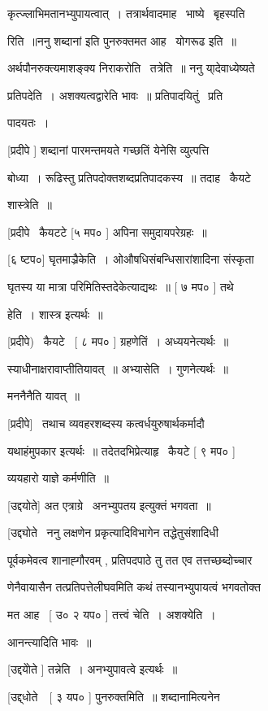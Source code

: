 \documentclass[11pt, openany]{book}
\begin{document}
कृत्ज्लाभिमतानभ्युपायत्वात्~। तत्रार्थवादमाह \textendash\ भाष्ये \textendash\ बृहस्पति \textendash\ 

रिति~॥ननु {\qt शब्दानां इति पुनरुक्तमत आह} \textendash\ योगरूढ इति~॥ 

अर्थपौनरुक्त्यमाशङ्क्य निराकरोति \textendash\ तत्रेति~॥ ननु या्देवाध्येष्यते 

प्रतिपदेति~। अशक्यत्वद्वारेति भावः~॥ प्रतिपादयितुं \textendash\ प्रति \textendash\ 

पादयतः~। 

[प्रदीपे ] शब्दानां पारमन्तमयते गच्छतिं येनेसि व्युत्पत्ति \textendash\ 

बोध्या~। रूढिस्तु प्रतिपदोक्तशब्दप्रतिपादकस्य~॥ तदाह \textendash\ कैयटे 

शास्त्रेति~॥ 

[प्रदीपे \textendash\ कैयटटे [५ मप० ] अपिना समुदायपरेग्रहः~॥ 

[६ ष्टप०] घृतमाञ्रैकेति~। ओऔषधिसंबन्धिसारांशादिना संस्कृता 

घृतस्य या मात्रा परिमितिस्तदेकेत्याद्यथः~॥ [ ७ मप० ] तथे \textendash\ 

हेति~। शास्त्र इत्यर्थः~॥ 

[प्रदीपे) \textendash\ कैयटे \textendash\ [ ८ मप० ] ग्रहणेतिं~। अध्ययनेत्यर्थः~॥ 

स्याधीनाक्षरावाप्तीतियावत्~॥ अभ्यासेति~। गुणनेत्यर्थः~॥ 

मननैनैति यावत्~॥ 

[प्रदीपे] \textendash\ तथाच व्यवहरशब्दस्य कत्वर्धयुरुषार्थकर्मादौ 

यथाहंमुपकार इत्यर्थः~॥ तदेतदभिप्रेत्याहृ \textendash\ कैयटे [ ९ मप० ] 

व्ययहारो याज्ञे कर्मणीति~॥ 

[उद्दयोते] अत एत्राग्रे \textendash\ अनभ्युपतय इत्युक्तं भगवता~॥ 

[उद्द्योते \textendash\ ननु लक्षणेन प्रकृत्यादिविभागेन तद्धेतुसंशादिधी \textendash\ 

पूर्वकमेवत्व शानाह्गौरवम् , प्रतिपदपाठे तु तत एव तत्तच्छब्दोच्चार \textendash\ 

णेनैवायासैन तत्प्रतिपत्तेलीघवमिति कथं तस्यानभ्युपायत्वं भगवतोक्त \textendash\ 

मत आह \textendash\ [ उ० २ यप० ] तत्त्वं चेति~। अशक्येति~। 

आनन्त्यादिति भावः~॥ 

[उद्दयोेते ] तन्नेति~। अनभ्युपावत्वे इत्यर्थः~॥ 

[उद्द्धोते\ \textendash\ [ ३ यप० ] पुनरुक्तमिति~॥ शब्दानामित्यनेन 
\end{document}
